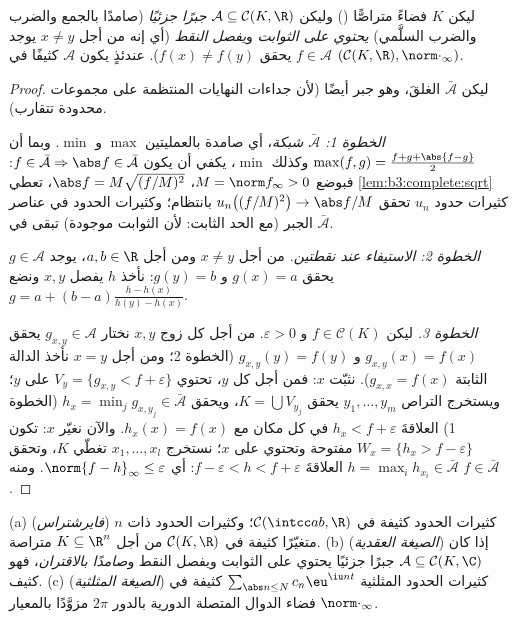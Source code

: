\begin{theorem}
\label{thm:b3:complete:stoneweierstrass}
ليكن $K$ فضاءً متراصًّا () وليكن $\mathcal A \subseteq
\mathcal C(K, \R)$ \emph{جبرًا
جزئيًا} (صامدًا بالجمع والضرب والضرب السلَّمي) \emph{يحتوي على
الثوابت} و\emph{يفصل النقط} (أي إنه من أجل $x \neq y$ يوجد
$f \in
\mathcal A$ يحقق $f(x) \neq f(y)$). عندئذٍ يكون $\mathcal A$ كثيفًا
في $(\mathcal C(K,\R), \norm\cdot_\infty)$.
\end{theorem}

\begin{proof}
ليكن $\bar{\mathcal A}$ الغلقَ، وهو جبر أيضًا (لأن جداءات النهايات
المنتظمة على مجموعات محدودة تتقارب).

\emph{الخطوة 1: $\bar{\mathcal A}$ شبكة}، أي صامدة بالعمليتين $\max$ و $\min$. وبما
أن $\max(f,g) = \frac{f + g +
\abs{f-g}}2$ وكذلك $\min$، يكفي أن يكون $f \in
\bar{\mathcal A} \Rightarrow \abs f \in \bar{\mathcal A}$: فبوضع $M = \norm f_\infty > 0$،
$\abs f = M\sqrt{(f/M)^2}$، تعطي \cref{lem:b3:complete:sqrt} كثيرات حدود $u_n$ تحقق $u_n\bigl((f/M)^2\bigr) \to \abs f/M$
بانتظام؛ وكثيرات الحدود في عناصر الجبر (مع الحد الثابت: لأن
الثوابت موجودة) تبقى في $\bar{\mathcal A}$.

\emph{الخطوة 2: الاستيفاء عند نقطتين.} من أجل $x \neq y$ ومن
أجل $a,
b \in \R$، يوجد $g \in \mathcal A$ يحقق $g(x) = a$ و $g(y) = b$: نأخذ
$h$ يفصل $x, y$ ونضع $g = a + (b -
a)\frac{h - h(x)}{h(y) - h(x)}$.

\emph{الخطوة 3.} ليكن $f \in \mathcal C(K)$ و $\varepsilon > 0$. من أجل كل زوج $x, y$
نختار $g_{x,y} \in \mathcal A$ يحقق $g_{x,y}(x) = f(x)$ و $g_{x,y}(y) = f(y)$ (الخطوة 2؛ ومن أجل $x = y$
نأخذ الدالة الثابتة $g_{x,x} = f(x)$). نثبّت $x$: فمن أجل كل
$y$، تحتوي  $V_y = \{g_{x,y} < f +
\varepsilon\}$ على $y$؛ ويستخرج التراص
$y_1, \dots,
y_m$ يحقق $K = \bigcup V_{y_j}$، ويحقق $h_x = \min_j g_{x, y_j}
\in \bar{\mathcal A}$ (الخطوة 1) العلاقةَ $h_x < f +
\varepsilon$
في كل مكان مع $h_x(x) = f(x)$. والآن نغيّر $x$: تكون $W_x =
\{h_x > f - \varepsilon\}$
مفتوحة وتحتوي على $x$؛ نستخرج $x_1,
\dots, x_l$ تغطّي $K$، وتحقق $h = \max_i h_{x_i} \in
\bar{\mathcal A}$
العلاقةَ $f - \varepsilon < h < f +
\varepsilon$: أي $\norm{f - h}_\infty \leq \varepsilon$. ومنه $f \in \bar{\mathcal A}$.
\end{proof}

\begin{corollary}\label{cor:b3:complete:weierstrass}
(a) (\emph{فايرشتراس}) كثيرات الحدود كثيفة في $\mathcal
C(\intcc ab, \R)$؛ وكثيرات
الحدود ذات $n$ متغيّرًا كثيفة في $\mathcal C(K, \R)$ من أجل $K \subseteq \R^n$ متراصة.
(b) (\emph{الصيغة العقدية}) إذا كان $\mathcal A \subseteq \mathcal
C(K, \C)$ جبرًا جزئيًا يحتوي
على الثوابت ويفصل النقط و\emph{صامدًا بالاقتران}، فهو كثيف.
(c) (\emph{الصيغة المثلثية}) كثيرات الحدود المثلثية $\sum_{\abs n \leq N}c_n\eu^{\iu n t}$
كثيفة في فضاء الدوال المتصلة الدورية بالدور $2\pi$ مزوَّدًا
بالمعيار $\norm\cdot_\infty$.
\end{corollary}

